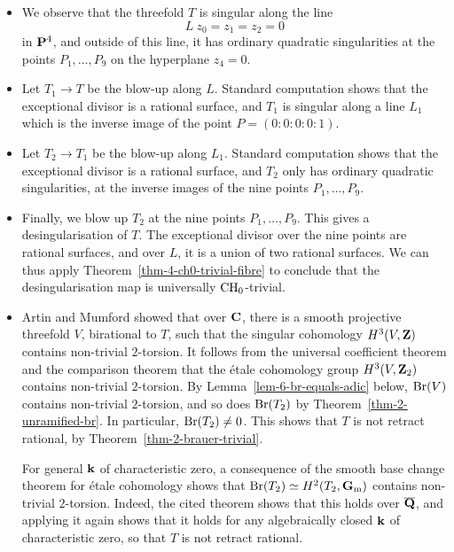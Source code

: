 \begin{itemize}
    \item
        We observe that the threefold $T$ is singular
        along the line
        \[ L \: z_0 = z_1 = z_2 = 0 \]
        in $\bbP^4$, and outside of this line, it has
        ordinary quadratic singularities at the points
        $P_1, \dotsc, P_9$ on the hyperplane $z_4 = 0$.

    \item
        Let $T_1 \to T$ be the blow-up along $L$.
        Standard computation shows that the exceptional divisor
        is a rational surface, and $T_1$ is singular
        along a line $L_1$ which is the inverse image of the point
        $P = (0:0:0:0:1)$.

    \item
        Let $T_2 \to T_1$ be the blow-up along $L_1$.
        Standard computation shows that the exceptional divisor
        is a rational surface, and $T_2$ only has ordinary quadratic singularities, at the inverse images of
        the nine points $P_1, \dotsc, P_9$.

    \item
        Finally, we blow up $T_2$ at the nine points $P_1, \dotsc, P_9$.
        This gives a desingularisation of $T$.
        The exceptional divisor over the nine points are rational surfaces,
        and over $L$, it is a union of two rational surfaces.
        We can thus apply Theorem~\ref{thm-4-ch0-trivial-fibre} to conclude that
        the desingularisation map is universally $\mathrm{CH}_0$-trivial.

    \item
        Artin and Mumford \cite[\S2]{artin-mumford}
        showed that over $\bbC$, there is a smooth projective threefold $V$, birational to $T$,
        such that the singular cohomology $H^3 (V, \bbZ)$ contains non-trivial $2$-torsion.
        It follows from the universal coefficient theorem and
        the comparison theorem \cite[Theorem~III.3.12, p.\,117]{milne}
        that the étale cohomology group $H^3 (V, \bbZ_2)$
        contains non-trivial $2$-torsion. By Lemma~\ref{lem-6-br-equals-adic} below,
        $\mathrm{Br} (V)$ contains non-trivial $2$-torsion,
        and so does $\mathrm{Br} (T_2)$ by Theorem~\ref{thm-2-unramified-br}.
        In particular, $\mathrm{Br} (T_2) \neq 0$.
        This shows that $T$ is not retract rational, by Theorem~\ref{thm-2-brauer-trivial}.

        For general $\bbk$ of characteristic zero, 
        a consequence of the smooth base change theorem for étale cohomology 
        \cite[Corollary~VI.4.3, p.\,231]{milne} shows that $\Br (T_2) \simeq H^2 (T_2, \Gm)$ 
        contains non-trivial $2$-torsion.
        Indeed, the cited theorem shows that this holds over $\bbQbar$,
        and applying it again shows that it holds for any algebraically closed $\bbk$ of characteristic zero,
        so that $T$ is not retract rational.
\end{itemize}

